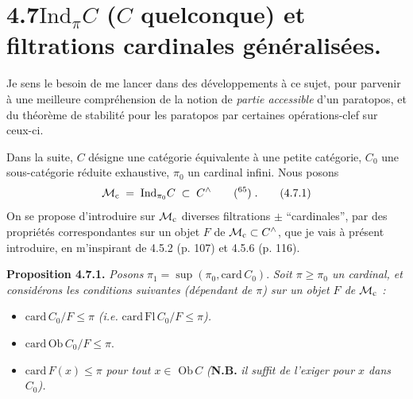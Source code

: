\section*{4.7\quad $\mathrm{Ind}_{\pi}C$ ($C$ quelconque) et filtrations cardinales généralisées.}

Je sens le besoin de me lancer dans des développements à ce sujet, pour parvenir à une meilleure compréhension de la notion de \textit{partie accessible} d'un paratopos, et du théorème de stabilité pour les paratopos par certaines opérations-clef sur ceux-ci.

Dans la suite, $C$ désigne une catégorie équivalente à une petite catégorie, $C_0$ une sous-catégorie réduite exhaustive, $\pi_0$ un cardinal infini. Nous posons
\[
\Mc \;=\; \mathrm{Ind}_{\pi_0}C \;\subset\; C^{\wedge} \qquad \text{(\footnotemark[65])}\;. \tag*{(4.7.1)}
\]
On se propose d'introduire sur $\mathcal{M}_{\mathrm{c}}$ diverses filtrations $\pm$ “cardinales”, par des propriétés correspondantes sur un objet $F$ de $\mathcal{M}_{\mathrm{c}} \subset C^{\wedge}$, que je vais à présent introduire, en m'inspirant de 4.5.2 (p. 107) et 4.5.6 (p. 116).

\textbf{Proposition 4.7.1.} \textit{Posons} $\pi_1 = \sup(\pi_0, \mathrm{card}\, C_0)$. \textit{Soit $\pi \geqslant \pi_0$ un cardinal, et considérons les conditions suivantes (dépendant de $\pi$) sur un objet $F$ de $\mathcal{M}_{\mathrm{c}}$ :}
\begin{itemize}[leftmargin=4em]
\item[\textit{a)}] $\mathrm{card}\, C_0/F \leqslant \pi$ \textit{(i.e.} $\mathrm{card}\,\mathrm{Fl}\, C_0/F \leqslant \pi$\textit{).}
\item[\textit{a$'$)}] $\mathrm{card}\,\mathrm{Ob}\, C_0/F \leqslant \pi$.
\item[\textit{a$''$)}] $\mathrm{card}\, F(x) \leqslant \pi$ \textit{pour tout $x \in$} $\mathrm{Ob}\, C$ \textit{(}\textbf{N.B.} \textit{il suffit de l'exiger pour $x$ dans $C_0$).}
\end{itemize}


